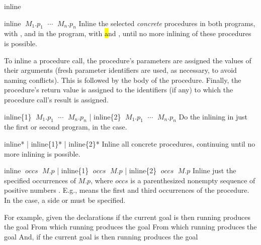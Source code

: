\begin{tactic}{inline}
  \begin{tsyntax}{inline $\;M_1$.$p_1$ $\;\cdots$ $\;M_n$.$p_n$}
    Inline the selected \emph{concrete} procedures in both programs,
    with \prhl, and in the program, with \hl and \phl, until no more
    inlining of these procedures is possible.

    To inline a procedure call, the procedure's parameters are
    assigned the values of their arguments (fresh parameter
    identifiers are used, as necessary, to avoid naming
    conflicts). This is followed by the body of the procedure. Finally,
    the procedure's return value is assigned to the identifiers (if
    any) to which the procedure call's result is assigned.
  \end{tsyntax}

  \begin{tsyntax}{inline\{1\} $\;M_1$.$p_1$ $\;\cdots$ $\;M_n$.$p_n$ | inline\{2\} $\;M_1$.$p_1$ $\;\cdots$ $\;M_n$.$p_n$}
    Do the inlining in just the first or second program, in the \prhl case.
  \end{tsyntax}

  \begin{tsyntax}{inline* | inline\{1\}* | inline\{2\}*}
    Inline all concrete procedures, continuing until no more inlining
    is possible.
  \end{tsyntax}

  \begin{tsyntax}{inline $\;\mathit{occs}$ $\;M$.$p$ | inline\{1\} $\;\mathit{occs}$ $\;M$.$p$ | inline\{2\} $\;\mathit{occs}$ $\;M$.$p$}
    Inline just the specified occurrences of $M$.$p$, where
    $\mathit{occs}$ is a parenthesized nonempty sequence of positive
    numbers . E.g.,  means the
    first and third occurrences of the procedure.  In the \prhl case,
    a side  or  must be specified.
  \end{tsyntax}

  \bigskip
  For example, given the declarations
  if the current goal is
   then
  running 
  produces the goal
  From which running
  produces the goal
  From which running
  produces the goal
  And, if the current goal is
   then
  running 
  produces the goal
\end{tactic}
